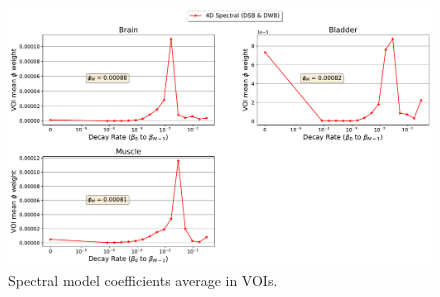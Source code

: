 \begin{figure} [h!]
\centering
\includegraphics[scale=0.48,angle=0]{3_Results/3_3_DWB_Reconstruction/figures/3_3_IsotoPK_CTRL_DWB_SpectralParams_peripheral_.pdf}
\caption{Spectral model coefficients average in VOIs.}
\label{fig_3_3:IsotoPK_CTRL_DSB_Spectrals}
\end{figure} 

\clearpage
